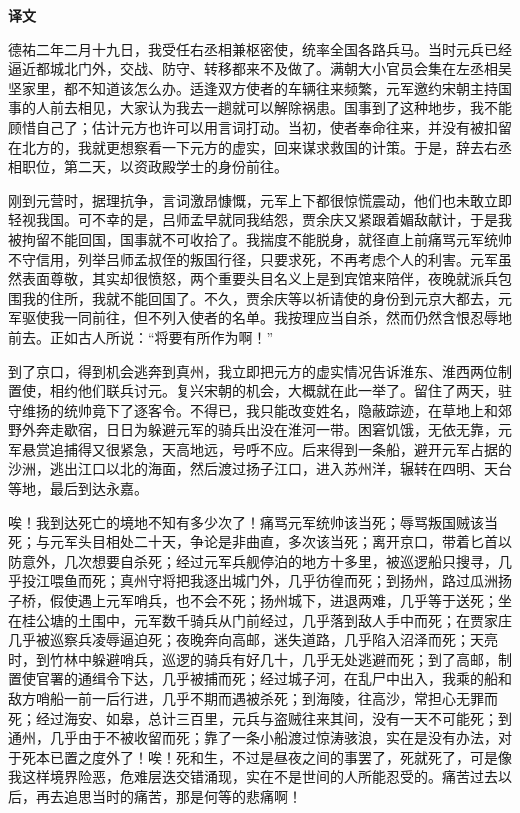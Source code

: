 \documentclass[12pt,UTF-8,openany,a4]{ctexbook}
\begin{document}
\newpage

\begin{Large}
    \noindent\textbf{译文}
\end{Large}


\vspace{1em}

\begin{large}
    \yiwen 
    德祐二年二月十九日，我受任右丞相兼枢密使，统率全国各路兵马。当时元兵已经逼近都城北门外，交战、防守、转移都来不及做了。满朝大小官员会集在左丞相吴坚家里，都不知道该怎么办。适逢双方使者的车辆往来频繁，元军邀约宋朝主持国事的人前去相见，大家认为我去一趟就可以解除祸患。国事到了这种地步，我不能顾惜自己了；估计元方也许可以用言词打动。当初，使者奉命往来，并没有被扣留在北方的，我就更想察看一下元方的虚实，回来谋求救国的计策。于是，辞去右丞相职位，第二天，以资政殿学士的身份前往。
    
    刚到元营时，据理抗争，言词激昂慷慨，元军上下都很惊慌震动，他们也未敢立即轻视我国。可不幸的是，吕师孟早就同我结怨，贾余庆又紧跟着媚敌献计，于是我被拘留不能回国，国事就不可收拾了。我揣度不能脱身，就径直上前痛骂元军统帅不守信用，列举吕师孟叔侄的叛国行径，只要求死，不再考虑个人的利害。元军虽然表面尊敬，其实却很愤怒，两个重要头目名义上是到宾馆来陪伴，夜晚就派兵包围我的住所，我就不能回国了。不久，贾余庆等以祈请使的身份到元京大都去，元军驱使我一同前往，但不列入使者的名单。我按理应当自杀，然而仍然含恨忍辱地前去。正如古人所说：“将要有所作为啊！”
    
    到了京口，得到机会逃奔到真州，我立即把元方的虚实情况告诉淮东、淮西两位制置使，相约他们联兵讨元。复兴宋朝的机会，大概就在此一举了。留住了两天，驻守维扬的统帅竟下了逐客令。不得已，我只能改变姓名，隐蔽踪迹，在草地上和郊野外奔走歇宿，日日为躲避元军的骑兵出没在淮河一带。困窘饥饿，无依无靠，元军悬赏追捕得又很紧急，天高地远，号呼不应。后来得到一条船，避开元军占据的沙洲，逃出江口以北的海面，然后渡过扬子江口，进入苏州洋，辗转在四明、天台等地，最后到达永嘉。
    
    唉！我到达死亡的境地不知有多少次了！痛骂元军统帅该当死；辱骂叛国贼该当死；与元军头目相处二十天，争论是非曲直，多次该当死；离开京口，带着匕首以防意外，几次想要自杀死；经过元军兵舰停泊的地方十多里，被巡逻船只搜寻，几乎投江喂鱼而死；真州守将把我逐出城门外，几乎彷徨而死；到扬州，路过瓜洲扬子桥，假使遇上元军哨兵，也不会不死；扬州城下，进退两难，几乎等于送死；坐在桂公塘的土围中，元军数千骑兵从门前经过，几乎落到敌人手中而死；在贾家庄几乎被巡察兵凌辱逼迫死；夜晚奔向高邮，迷失道路，几乎陷入沼泽而死；天亮时，到竹林中躲避哨兵，巡逻的骑兵有好几十，几乎无处逃避而死；到了高邮，制置使官署的通缉令下达，几乎被捕而死；经过城子河，在乱尸中出入，我乘的船和敌方哨船一前一后行进，几乎不期而遇被杀死；到海陵，往高沙，常担心无罪而死；经过海安、如皋，总计三百里，元兵与盗贼往来其间，没有一天不可能死；到通州，几乎由于不被收留而死；靠了一条小船渡过惊涛骇浪，实在是没有办法，对于死本已置之度外了！唉！死和生，不过是昼夜之间的事罢了，死就死了，可是像我这样境界险恶，危难层迭交错涌现，实在不是世间的人所能忍受的。痛苦过去以后，再去追思当时的痛苦，那是何等的悲痛啊！
    

\end{large}
\end{document}
